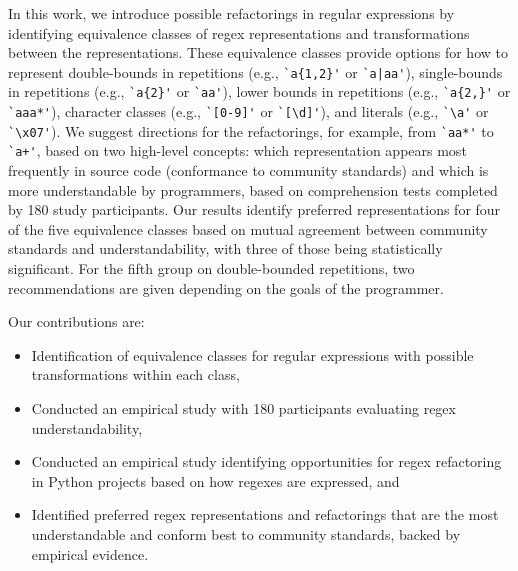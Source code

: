 In this work, we introduce possible refactorings in regular expressions by identifying equivalence classes of regex representations and transformations between the representations.
These equivalence classes provide options for how to represent double-bounds in repetitions (e.g., \verb!`a{1,2}'! or \verb!`a|aa'!), single-bounds in repetitions (e.g., \verb!`a{2}'! or \verb!`aa'!), lower bounds in repetitions (e.g., \verb!`a{2,}'! or \verb!`aaa*'!), character classes (e.g., \verb!`[0-9]'! or \verb!`[\d]'!), and literals (e.g., \verb!`\a'! or \verb!`\x07'!).
We suggest directions for the refactorings, for example, from \verb!`aa*'!  to  \verb!`a+'!, based on two high-level concepts: which representation appears most frequently in source code (conformance to community standards) and which is more understandable by programmers, based on comprehension tests completed by 180 study participants.
Our results identify preferred representations for four of the five equivalence classes based on mutual agreement between community standards and understandability, with three of those being statistically significant. For the fifth group on double-bounded repetitions, two recommendations are given depending on the goals of the programmer.

Our contributions are:
\begin{itemize}
\item Identification of  equivalence classes for regular expressions with possible transformations within each class,
\item Conducted an empirical study with 180 participants evaluating regex understandability,
\item Conducted an empirical study identifying opportunities for regex refactoring  in Python projects based on how regexes are expressed, and
\item {Identified preferred regex representations and refactorings that are the most understandable and conform best to community standards, backed by empirical evidence.}
\end{itemize}

